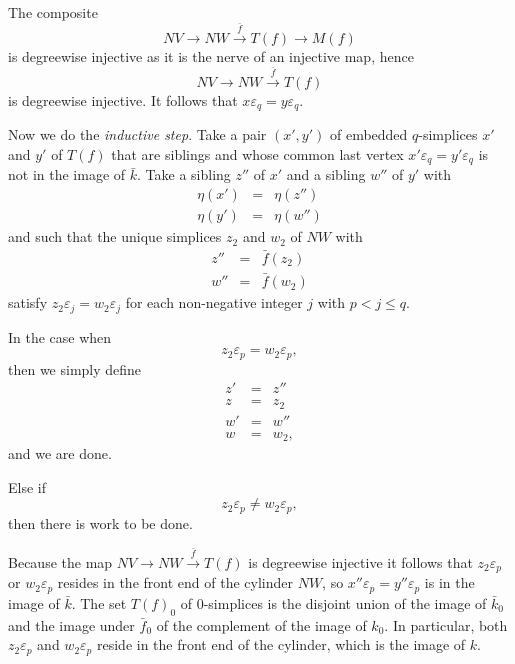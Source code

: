 The composite
\[NV\to NW\xrightarrow{\bar{f} } T(f)\to M(f)\]
is degreewise injective as it is the nerve of an injective map, hence
\[NV\to NW\xrightarrow{\bar{f} } T(f)\]
is degreewise injective. It follows that $x\varepsilon _q=y\varepsilon _q$.

Now we do the \emph{inductive step}. Take a pair $(x',y')$ of embedded $q$-simplices $x'$ and $y'$ of $T(f)$ that are siblings and whose common last vertex $x'\varepsilon _q=y'\varepsilon _q$ is not in the image of $\bar{k}$. Take a sibling $z''$ of $x'$ and a sibling $w''$ of $y'$ with
\begin{displaymath}
\begin{array}{rcl}
\eta (x') & = & \eta (z'') \\
\eta (y') & = & \eta (w'')
\end{array}
\end{displaymath}
and such that the unique simplices $z_2$ and $w_2$ of $NW$ with
\begin{displaymath}
\begin{array}{rcl}
z'' & = & \bar{f} (z_2) \\
w'' & = & \bar{f} (w_2)
\end{array}
\end{displaymath}
satisfy $z_2\varepsilon _j=w_2\varepsilon _j$ for each non-negative integer $j$ with $p<j\leq q$.

In the case when
\[z_2\varepsilon _p=w_2\varepsilon _p,\]
then we simply define
\begin{displaymath}
\begin{array}{rcl}
z' & = & z'' \\
z & = & z_2 \\
w' & = & w'' \\
w & = & w_2,
\end{array}
\end{displaymath}
and we are done.

Else if
\[z_2\varepsilon _p\neq w_2\varepsilon _p,\]
then there is work to be done.

Because the map $NV\to NW\xrightarrow{\bar{f} } T(f)$ is degreewise injective it follows that $z_2\varepsilon _p$ or $w_2\varepsilon _p$ resides in the front end of the cylinder $NW$, so $x''\varepsilon _p=y''\varepsilon _p$ is in the image of $\bar{k}$. The set $T(f)_0$ of $0$-simplices is the disjoint union of the image of $\bar{k} _0$ and the image under $\bar{f} _0$ of the complement of the image of $k_0$. In particular, both $z_2\varepsilon _p$ and $w_2\varepsilon _p$ reside in the front end of the cylinder, which is the image of $k$.


